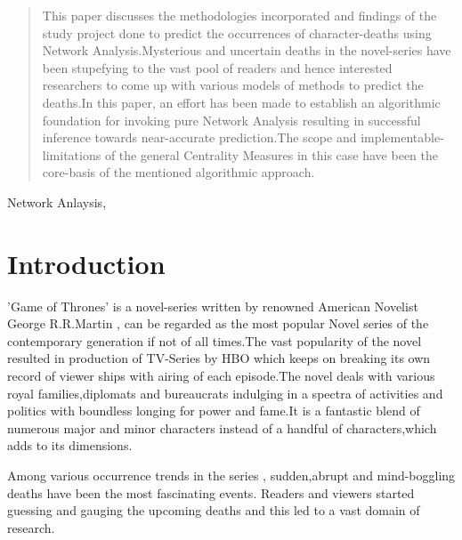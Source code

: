 \documentclass[conference]{IEEEtran}
\begin{document}
\begin{abstract}
This paper discusses the methodologies incorporated and findings of the study project done to predict the occurrences of character-deaths using Network Analysis.Mysterious and uncertain deaths in the novel-series have been stupefying to the vast pool of readers and hence interested researchers to come up with various models of methods to predict the deaths.In this paper, an effort has been made to establish an algorithmic foundation for invoking pure Network Analysis resulting in successful inference towards near-accurate prediction.The scope and implementable-limitations of the general Centrality Measures in this case have been the core-basis of the mentioned algorithmic approach.   

\end{abstract}

\begin{IEEEkeywords}
Network Anlaysis, 
\end{IEEEkeywords}

\section{Introduction}

'Game of Thrones' is a novel-series written by renowned American Novelist George R.R.Martin , can be regarded as the most popular Novel series of the contemporary generation if not of all times.The vast popularity of the novel resulted in production of TV-Series by HBO which keeps on breaking its own record of viewer ships with airing of each episode.The novel deals with various royal families,diplomats and bureaucrats indulging in a spectra of activities and politics with boundless longing for power and fame.It is a fantastic blend of numerous major and minor characters instead of a handful of characters,which adds to its dimensions.

Among various occurrence trends in the series , sudden,abrupt and mind-boggling deaths have been the most fascinating events. Readers and viewers started guessing and gauging the upcoming deaths and this led to a vast domain of research.
\end{document}

